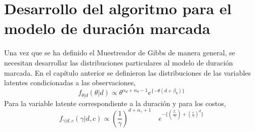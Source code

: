 \section{Desarrollo del algoritmo para el modelo de duraci\'on marcada}
Una vez que se ha definido el Muestreador de Gibbs de manera general, se necesitan desarrollar las distribuciones particulares al modelo de duraci\'on marcada. En el cap\'itulo anterior se definieron las distribuciones de las variables latentes condicionadas a las observaciones,
\[f_{\theta|d}(\theta|d) \propto \theta^{\alpha_d+\alpha_\theta-1} e^{\{-\theta(d+\beta_\theta)\}}\]
Para la variable latente correspondiente a la duraci\'on y para los costos,
\[f_{\gamma|d,c}(\gamma|d,c) \propto (\frac{1}{\gamma})^{d+\alpha_\gamma+1} \quad e^{-\{(\frac{\beta_\gamma}{\gamma})+(\frac{c}{\gamma})^d\}}\]

